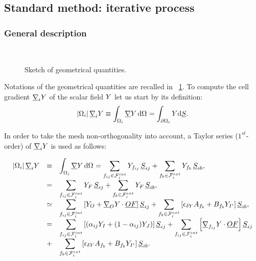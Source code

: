 \subsection{Standard method: iterative process}\label{sec:spadis:iteratif_gradient}


\subsubsection{General description}
\begin{figure}[!htbp]
\centering
\mbox{
 \,
}
\caption{\label{fig:geom_gradrc}
Sketch of geometrical quantities.
}
\end{figure}

Notations of the geometrical quantities are recalled in \figurename~\ref{fig:geom_gradrc}.
To compute the cell gradient $\underline{\nabla}_{i} Y $ of the scalar field $Y$ let us
start by its definition:
\begin{equation}
\left| \Omega_{i} \right| \underline{\nabla}_{i} Y \equiv  \displaystyle \int_{\Omega_{i}}{\underline{\nabla} Y \, \mathrm{d} \Omega_{} } = \int_{\partial \Omega_{i}} Y \mathrm{d} \underline{S}.
\end{equation}


In order to take the mesh non-orthogonality into account, a Taylor series ($1^{st}$-order) of $\underline{\nabla}_{i} Y$ is used as follows:

\begin{equation}\label{eq:compute_gradrc1}
\begin{array}{r c l}
\left| \Omega_{i} \right| \underline{\nabla}_{i} Y &
\equiv & \displaystyle
\int_{\Omega_{i}}{\underline{\nabla} Y \, \mathrm{d} \Omega_{} }
= \sum\limits_{ {f_{ij}} \in \mathcal{F}^{int}_{i}}
Y_{{f_{ij}}}\,{\underline{S}_{{ij} }}
+\sum\limits_{ {f_{b}} \in \mathcal{F}^{ext}_{i}}
Y_{{f_{b}}}\,{\underline{S}_{{ib} }}, \\
&=& \displaystyle
 \sum\limits_{ {f_{ij}} \in \mathcal{F}^{int}_{i}}
Y_{F}\,{\underline{S}_{{ij} }}
+\sum\limits_{ {f_{b}} \in \mathcal{F}^{ext}_{i}}
Y_{F}\,{\underline{S}_{{ib} }}, \\
&\simeq &  \displaystyle
\sum\limits_{ {f_{ij}} \in \mathcal{F}^{int}_{i}} \left[ Y_{O}+ \underline{\nabla}_{O} Y \cdot \underline{O F} \right] \underline{S}_{{ij}}+
\sum\limits_{ {f_{b}} \in \mathcal{F}^{ext}_{i}} \left[ \epsilon_{\delta Y} A_{{f_{b}}} + B_{{f_{b}}} Y_{{I^\prime}} \right] \underline{S}_{{ib}} ,\\
 & = &\displaystyle
\sum\limits_{ {f_{ij}} \in \mathcal{F}^{int}_{i}}
\left[
\left( \alpha_{{ij}} Y_I +
(1 - \alpha_{{ij}}) Y_J \right) \right] \underline{S}_{{ij}} +
\sum\limits_{ {f_{ij}} \in \mathcal{F}^{int}_{i}} \left[
\underline{\nabla}_{{f_{ij}}} Y  \cdot  \underline{O F} \right] \underline{S}_{{ij}} \\
&+&\displaystyle
\sum\limits_{ {f_{b}} \in \mathcal{F}^{ext}_{i}} \left[ \epsilon_{\delta Y} A_{{f_{b}}} + B_{{f_{b}}} Y_{{I^\prime}} \right] \underline{S}_{{ib}} .
\end{array}
\end{equation}

